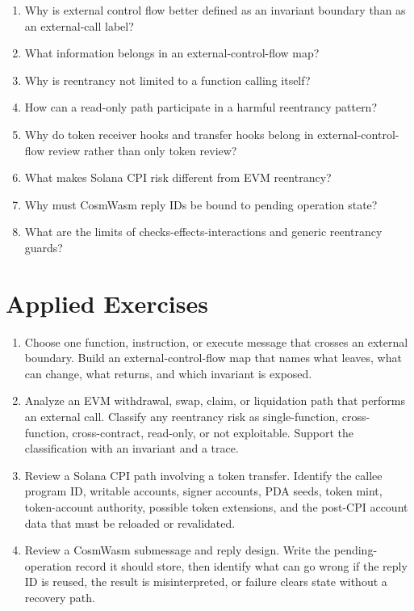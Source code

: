 \begin{enumerate}
\item Why is external control flow better defined as an invariant boundary than as an external-call label?
\item What information belongs in an external-control-flow map?
\item Why is reentrancy not limited to a function calling itself?
\item How can a read-only path participate in a harmful reentrancy pattern?
\item Why do token receiver hooks and transfer hooks belong in external-control-flow review rather than only token review?
\item What makes Solana CPI risk different from EVM reentrancy?
\item Why must CosmWasm reply IDs be bound to pending operation state?
\item What are the limits of checks-effects-interactions and generic reentrancy guards?
\end{enumerate}

\section*{Applied Exercises}

\begin{enumerate}
\item Choose one function, instruction, or execute message that crosses an external boundary. Build an external-control-flow map that names what leaves, what can change, what returns, and which invariant is exposed.

\item Analyze an EVM withdrawal, swap, claim, or liquidation path that performs an external call. Classify any reentrancy risk as single-function, cross-function, cross-contract, read-only, or not exploitable. Support the classification with an invariant and a trace.

\item Review a Solana CPI path involving a token transfer. Identify the callee program ID, writable accounts, signer accounts, PDA seeds, token mint, token-account authority, possible token extensions, and the post-CPI account data that must be reloaded or revalidated.

\item Review a CosmWasm submessage and reply design. Write the pending-operation record it should store, then identify what can go wrong if the reply ID is reused, the result is misinterpreted, or failure clears state without a recovery path.
\end{enumerate}
